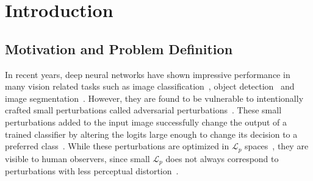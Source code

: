 \chapter{Introduction}
\label{chp:1_introduction}

\section{Motivation and Problem Definition}
In recent years, deep neural networks have shown impressive performance in many vision related tasks such as image classification~\cite{he2015deep}, object detection~\cite{redmon2018yolov3} and image segmentation~\cite{long2015fully}. However, they are found to be vulnerable to intentionally crafted small perturbations called adversarial perturbations~\cite{szegedy2013intriguing}. These small perturbations added to the input image successfully change the output of a trained classifier by altering the logits large enough to change its decision to a preferred class~\cite{goodfellow2014explaining}. While these perturbations are optimized in \(\mathcal{L}_p\) spaces~\cite{carlini2017towards}, they are visible to human observers, since small \(\mathcal{L}_p\) does not always correspond to perturbations with less perceptual distortion~\cite{jordan2019quantifying,engstrom2018rotation}.

